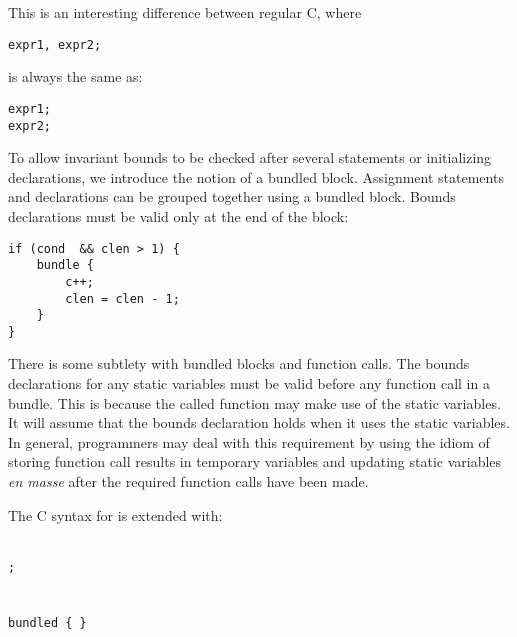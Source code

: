 This is an interesting difference between regular C, where

\begin{verbatim}
expr1, expr2;
\end{verbatim}

is always the same as:

\begin{verbatim}
expr1;
expr2;
\end{verbatim}

To allow invariant bounds to be checked after several statements or
initializing declarations, we introduce the notion of a bundled block.
Assignment statements and declarations can be grouped together using a
bundled block. Bounds declarations must be valid only at the end of the
block:

\begin{verbatim}
if (cond  && clen > 1) {
    bundle {
        c++;
        clen = clen - 1;
    }
}
\end{verbatim}

There is some subtlety with bundled blocks and function calls. The
bounds declarations for any static variables must be valid before any
function call in a bundle. This is because the called function may make
use of the static variables. It will assume that the bounds declaration
holds when it uses the static variables. In general, programmers may
deal with this requirement by using the idiom of storing function call
results in temporary variables and updating static variables \textit{en
masse} after the required function calls have been made.

The C syntax for is extended with:
\begin{tabbing}
\=\\
\>\texttt{;} \\
\\
 \\
\>\texttt{bundled \{  \}} \\
\\
\\
\>  \\
\>  \\
\\
\\
\> \\
\>  
\end{tabbing}

